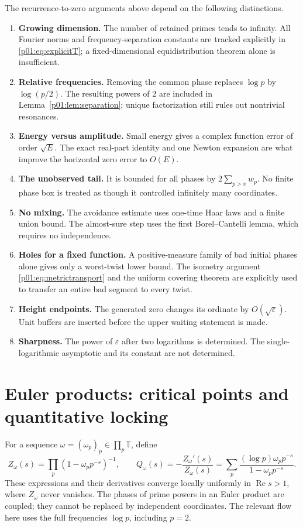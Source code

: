 \documentclass[11pt,letterpaper]{article}
\theoremstyle{definition}
\theoremstyle{remark}
\newcommand{\T}{\mathbb T}
\newcommand{\eps}{\varepsilon}
\renewcommand{\Re}{\operatorname{Re}}
\newcommand{\1}{\mathbf 1}
\begin{document}
The recurrence-to-zero arguments above depend on the following distinctions.
\begin{enumerate}[leftmargin=2em]
\item \textbf{Growing dimension.} The number of retained primes tends
to infinity. All Fourier norms and frequency-separation constants
are tracked explicitly in \eqref{p01:eq:explicitT}; a fixed-dimensional
equidistribution theorem alone is insufficient.
\item \textbf{Relative frequencies.} Removing the common phase
replaces $\log p$ by $\log(p/2)$. The resulting powers of $2$ are
included in Lemma~\ref{p01:lem:separation}; unique factorization still
rules out nontrivial resonances.
\item \textbf{Energy versus amplitude.} Small energy gives a complex
function error of order $\sqrt E$. The exact real-part identity and
one Newton expansion are what improve the horizontal zero error to
$O(E)$.
\item \textbf{The unobserved tail.} It is bounded for all phases by
$2\sum_{p>x}w_p$. No finite phase box is treated as though it
controlled infinitely many coordinates.
\item \textbf{No mixing.} The avoidance estimate uses one-time Haar
laws and a finite union bound. The almost-sure step uses the first
Borel--Cantelli lemma, which requires no independence.
\item \textbf{Holes for a fixed function.} A positive-measure family
of bad initial phases alone gives only a worst-twist lower bound.
The isometry argument \eqref{p01:eq:metrictransport} and the uniform
covering theorem are explicitly used to transfer an entire bad
segment to every twist.
\item \textbf{Height endpoints.} The generated zero changes its
ordinate by $O(\sqrt\eps)$. Unit buffers are inserted before the
upper waiting statement is made.
\item \textbf{Sharpness.} The power of $\eps$ after two logarithms
is determined. The single-logarithmic asymptotic and its constant
are not determined.
\end{enumerate}

\section{Euler products: critical points and quantitative locking}
\label{p02:sec:euler}

For a sequence $\omega=(\omega_p)_p\in\prod_p\T$, define
\begin{equation}\label{p02:eul:product}
 Z_\omega(s)=\prod_p(1-\omega_pp^{-s})^{-1},\qquad
 Q_\omega(s)=-\frac{Z_\omega'(s)}{Z_\omega(s)}
 =\sum_p\frac{(\log p)\omega_pp^{-s}}{1-\omega_pp^{-s}}.
\end{equation}
These expressions and their derivatives converge locally uniformly in
$\Re s>1$, where $Z_\omega$ never vanishes. The phases of prime powers
in an Euler product are coupled; they cannot be replaced by independent
coordinates. The relevant flow here uses the full frequencies $\log p$,
including $p=2$.
\end{document}

